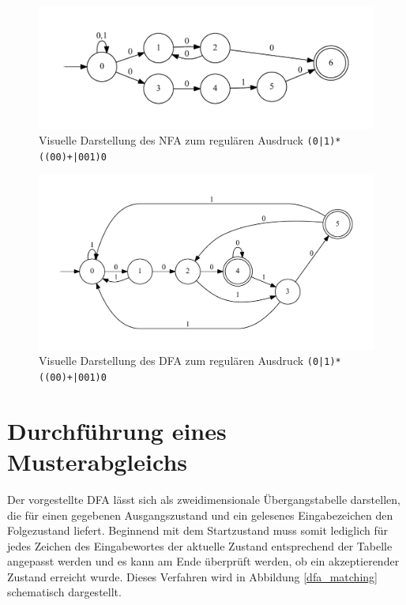\begin{figure}[ht]
	\includegraphics[width=\textwidth]{bilder/nfa_beispiel.pdf}
	\caption{Visuelle Darstellung des NFA zum regulären Ausdruck \texttt{(0|1)*((00)+|001)0}}
	\label{nfa_beispiel}
\end{figure}

\begin{figure}[ht]
	\includegraphics[width=\textwidth]{bilder/dfa_beispiel.pdf}
	\caption{Visuelle Darstellung des DFA zum regulären Ausdruck \texttt{(0|1)*((00)+|001)0}}
	\label{dfa_beispiel}
\end{figure}

\section{Durchführung eines Musterabgleichs}

Der vorgestellte DFA lässt sich als zweidimensionale Übergangstabelle darstellen, die für einen gegebenen Ausgangszustand und ein gelesenes Eingabezeichen den Folgezustand liefert.
Beginnend mit dem Startzustand muss somit lediglich für jedes Zeichen des Eingabewortes der aktuelle Zustand entsprechend der Tabelle angepasst werden und es kann am Ende überprüft werden, ob ein akzeptierender Zustand erreicht wurde.
Dieses Verfahren wird in Abbildung \ref{dfa_matching} schematisch dargestellt.

